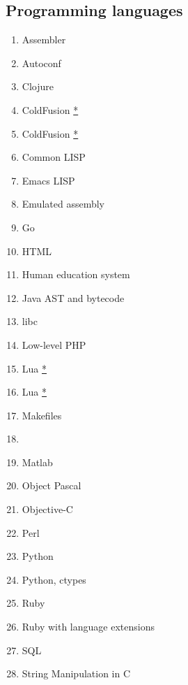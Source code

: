 \documentclass[conference,10pt]{IEEEtran}
\begin{document}
\begin{figure}[H]
 \subsection{Programming languages}
 \begin{multicols}{2}
 \begin{enumerate}
    \setcounter{enumi}{\value{topics}}
    \item Assembler
    \item Autoconf
    \item Clojure
    \item ColdFusion \hyperref[duplicate]{*}
    \item ColdFusion \hyperref[duplicate]{*}
    \item Common LISP
    \item Emacs LISP
    \item Emulated assembly
    \item Go
    \item HTML
    \item Human education system
    \item Java AST and bytecode
    \item libc
    \item Low-level PHP
    \item Lua \hyperref[duplicate]{*}
    \item Lua \hyperref[duplicate]{*}
    \item Makefiles
    \item {}
    \item Matlab
    \item Object Pascal
    \item Objective-C
    \item Perl
    \item Python
    \item Python, ctypes
    \item Ruby
    \item Ruby with language extensions
    \item SQL
    \item String Manipulation in C
    \setcounter{topics}{\value{enumi}}
 \end{enumerate}
 \end{multicols}
 \end{figure}
\end{document}
